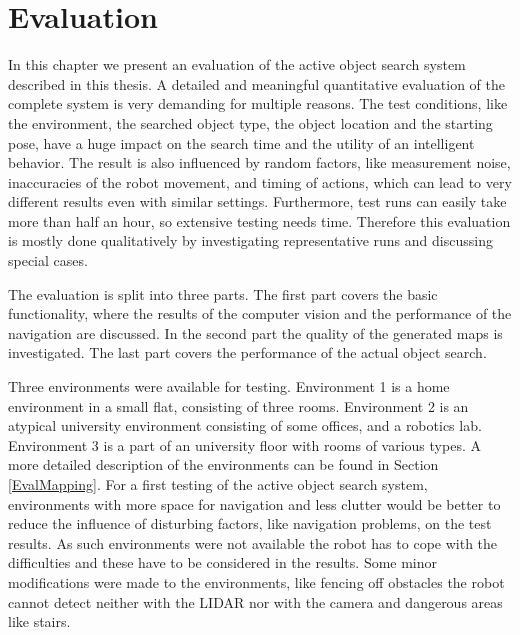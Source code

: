 \chapter{Evaluation}

In this chapter we present an evaluation of the active object search system described in this thesis. A detailed and meaningful quantitative evaluation of the complete system is very demanding for multiple reasons. The test conditions, like the environment, the searched object type, the object location and the starting pose, have a huge impact on the search time and the utility of an intelligent behavior. The result is also influenced by random factors, like measurement noise, inaccuracies of the robot movement, and timing of actions, which can lead to very different results even with similar settings. Furthermore, test runs can easily take more than half an hour, so extensive testing needs time. Therefore this evaluation is mostly done qualitatively by investigating representative runs and discussing special cases.

The evaluation is split into three parts. The first part covers the basic functionality, where the results of the computer vision and the performance of the navigation are discussed. In the second part the quality of the generated maps is investigated. The last part covers the performance of the actual object search.

Three environments were available for testing. Environment 1 is a home environment in a small flat, consisting of three rooms. Environment 2 is an atypical university environment consisting of some offices, and a robotics lab. Environment 3 is a part of an university floor with rooms of various types. A more detailed description of the environments can be found in Section \ref{EvalMapping}. For a first testing of the active object search system, environments with more space for navigation and less clutter would be better to reduce the influence of disturbing factors, like navigation problems, on the test results. As such environments were not available the robot has to cope with the difficulties and these have to be considered in the results. Some minor modifications were made to the environments, like fencing off obstacles the robot cannot detect neither with the LIDAR nor with the camera and dangerous areas like stairs.




